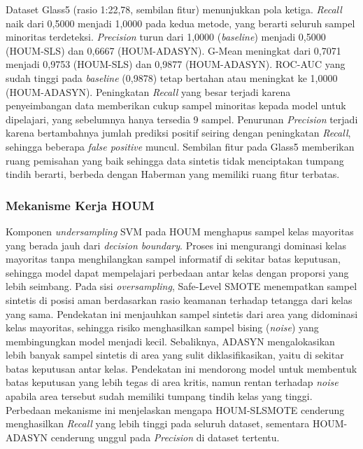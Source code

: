 Dataset Glass5 (rasio 1:22,78, sembilan fitur) menunjukkan pola ketiga. \textit{Recall} naik dari 0,5000 menjadi 1,0000 pada kedua metode, yang berarti seluruh sampel minoritas terdeteksi. \textit{Precision} turun dari 1,0000 (\textit{baseline}) menjadi 0,5000 (HOUM-SLS) dan 0,6667 (HOUM-ADASYN). G-Mean meningkat dari 0,7071 menjadi 0,9753 (HOUM-SLS) dan 0,9877 (HOUM-ADASYN). ROC-AUC yang sudah tinggi pada \textit{baseline} (0,9878) tetap bertahan atau meningkat ke 1,0000 (HOUM-ADASYN). Peningkatan \textit{Recall} yang besar terjadi karena penyeimbangan data memberikan cukup sampel minoritas kepada model untuk dipelajari, yang sebelumnya hanya tersedia 9 sampel. Penurunan \textit{Precision} terjadi karena bertambahnya jumlah prediksi positif seiring dengan peningkatan \textit{Recall}, sehingga beberapa \textit{false positive} muncul. Sembilan fitur pada Glass5 memberikan ruang pemisahan yang baik sehingga data sintetis tidak menciptakan tumpang tindih berarti, berbeda dengan Haberman yang memiliki ruang fitur terbatas. \par

\subsubsection{Mekanisme Kerja HOUM}
Komponen \textit{undersampling} SVM pada HOUM menghapus sampel kelas mayoritas yang berada jauh dari \textit{decision boundary}. Proses ini mengurangi dominasi kelas mayoritas tanpa menghilangkan sampel informatif di sekitar batas keputusan, sehingga model dapat mempelajari perbedaan antar kelas dengan proporsi yang lebih seimbang. Pada sisi \textit{oversampling}, Safe-Level SMOTE menempatkan sampel sintetis di posisi aman berdasarkan rasio keamanan terhadap tetangga dari kelas yang sama. Pendekatan ini menjauhkan sampel sintetis dari area yang didominasi kelas mayoritas, sehingga risiko menghasilkan sampel bising (\textit{noise}) yang membingungkan model menjadi kecil. Sebaliknya, ADASYN mengalokasikan lebih banyak sampel sintetis di area yang sulit diklasifikasikan, yaitu di sekitar batas keputusan antar kelas. Pendekatan ini mendorong model untuk membentuk batas keputusan yang lebih tegas di area kritis, namun rentan terhadap \textit{noise} apabila area tersebut sudah memiliki tumpang tindih kelas yang tinggi. Perbedaan mekanisme ini menjelaskan mengapa HOUM-SLSMOTE cenderung menghasilkan \textit{Recall} yang lebih tinggi pada seluruh dataset, sementara HOUM-ADASYN cenderung unggul pada \textit{Precision} di dataset tertentu. \par
